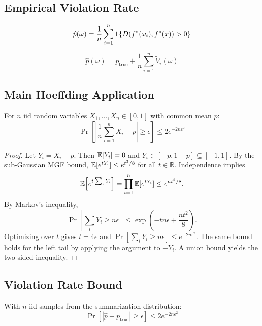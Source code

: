 \subsection{Empirical Violation Rate}

\begin{definition}
\[
\hat{p}(\omega) = \frac{1}{n} \sum_{i=1}^n \mathbf{1}\{D(f^{\ast}(\omega_i), f^{\ast}(x)) > 0\}
\]
\end{definition}

\begin{lemma}
\[
\hat{p}(\omega) = p_{\text{true}} + \frac{1}{n}\sum_{i=1}^n \tilde{V}_i(\omega)
\]
\end{lemma}

\subsection{Main Hoeffding Application}

\begin{theorem}\label{thm:hoeffding-iid}
For $n$ iid random variables $X_1, \ldots, X_n \in [0, 1]$ with common mean $p$:
\[
\Pr\left[\left|\frac{1}{n}\sum_{i=1}^n X_i - p\right| \ge \epsilon\right] \le 2e^{-2n\epsilon^2}
\]
\end{theorem}

\begin{proof}
Let $Y_i=X_i-p$. Then $\mathbb{E}[Y_i]=0$ and $Y_i\in[-p,1-p]\subseteq[-1,1]$. By the sub-Gaussian MGF bound,
$\mathbb{E}[e^{tY_i}]\le e^{t^2/8}$ for all $t\in\mathbb{R}$. Independence implies
\[
\mathbb{E}\!\left[e^{t\sum_i Y_i}\right]=\prod_{i=1}^n \mathbb{E}[e^{tY_i}] \le e^{nt^2/8}.
\]
By Markov's inequality,
\[
\Pr\!\left[\sum_i Y_i \ge n\epsilon\right]
\le \exp\!\left(-tn\epsilon+\frac{nt^2}{8}\right).
\]
Optimizing over $t$ gives $t=4\epsilon$ and
$\Pr[\sum_i Y_i \ge n\epsilon]\le e^{-2n\epsilon^2}$. The same bound holds for the left tail by applying the argument to $-Y_i$. A union bound yields the two-sided inequality.
\end{proof}


\subsection{Violation Rate Bound}

\begin{theorem}
With $n$ iid samples from the summarization distribution:
\[
\Pr\left[|\hat{p} - p_{\text{true}}| \ge \epsilon\right] \le 2e^{-2n\epsilon^2}
\]
\end{theorem}

